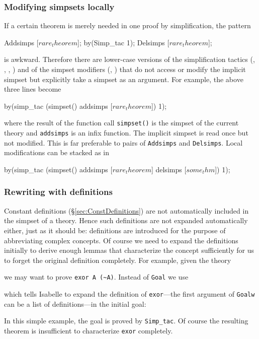 \subsubsection{Modifying simpsets locally}

If a certain theorem is merely needed in one proof by simplification, the
pattern
\begin{ttbox}
Addsimps [\(rare_theorem\)];
by(Simp_tac 1);
Delsimps [\(rare_theorem\)];
\end{ttbox}
is awkward. Therefore there are lower-case versions of the simplification
tactics (, ,
, ) and of the
simpset modifiers (, )
that do not access or modify the implicit simpset but explicitly take a
simpset as an argument. For example, the above three lines become
\begin{ttbox}
by(simp_tac (simpset() addsimps [\(rare_theorem\)]) 1);
\end{ttbox}
where the result of the function call \texttt{simpset()} is the simpset of
the current theory and \texttt{addsimps} is an infix function. The implicit
simpset is read once but not modified.
This is far preferable to pairs of \texttt{Addsimps} and \texttt{Delsimps}.
Local modifications can be stacked as in
\begin{ttbox}
by(simp_tac (simpset() addsimps [\(rare_theorem\)] delsimps [\(some_thm\)]) 1);
\end{ttbox}

\subsubsection{Rewriting with definitions}

Constant definitions (\S\ref{sec:ConstDefinitions}) are not automatically
included in the simpset of a theory. Hence such definitions are not expanded
automatically either, just as it should be: definitions are introduced for
the purpose of abbreviating complex concepts. Of course we need to expand the
definitions initially to derive enough lemmas that characterize the concept
sufficiently for us to forget the original definition completely. For
example, given the theory
\begin{ttbox}
\end{ttbox}
we may want to prove \verb$exor A (~A)$. Instead of \texttt{Goal} we use
\begin{ttbox}
\end{ttbox}
which tells Isabelle to expand the definition of \texttt{exor}---the first
argument of \texttt{Goalw} can be a list of definitions---in the initial goal:
\begin{ttbox}
\end{ttbox}
In this simple example, the goal is proved by \texttt{Simp_tac}.
Of course the resulting theorem is insufficient to characterize \texttt{exor}
completely.

